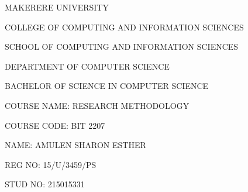 \documentclass[14pt]{article}
\begin{document}
\begin{center}\begin{small} MAKERERE UNIVERSITY \end{small}\end{center}

\begin{center}\begin{small} COLLEGE OF COMPUTING AND INFORMATION SCIENCES \end{small}\end{center}

\begin{center}\begin{small} SCHOOL OF COMPUTING AND INFORMATION SCIENCES \end{small}\end{center}

\begin{center}\begin{small} DEPARTMENT OF COMPUTER SCIENCE \end{small}\end{center}

\begin{center}\begin{small} BACHELOR OF SCIENCE IN COMPUTER SCIENCE \end{small}\end{center}

\begin{center}\begin{small} COURSE NAME: RESEARCH METHODOLOGY \end{small}\end{center}

\begin{center}\begin{small} COURSE CODE: BIT 2207 \end{small}\end{center}

\begin{center}\begin{small} NAME: AMULEN SHARON ESTHER \end{small}\end{center}

\begin{center}\begin{small} REG NO: 15/U/3459/PS \end{small}\end{center}

\begin{center}\begin{small} STUD NO: 215015331 \end{small}\end{center}
\end{document}
